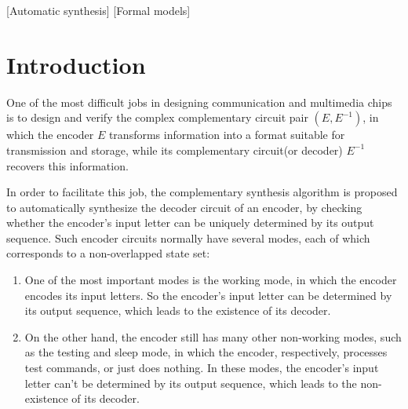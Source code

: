 \documentclass{sig-alternate}
\begin{document}
[Automatic synthesis]
[Formal models]


\newtheorem{algo}{Algorithm}
\newtheorem{lemma}{\textbf{Lemma}}
\newtheorem{theorem}{\textbf{Theorem}}

\section{Introduction}\label{sec_intro}

One of the most difficult jobs in designing communication and multimedia chips
is to design and verify the complex complementary circuit pair $(E,E^{-1})$,
in which the encoder $E$ transforms information into a format suitable for transmission and storage,
while its complementary circuit(or decoder) $E^{-1}$ recovers this information.

In order to facilitate this job,
the complementary synthesis algorithm\cite{ShengYuShen:iccad09,ShengYuShen:tcad} is proposed
to automatically synthesize the decoder circuit of an encoder,
by checking whether the encoder's input letter can be uniquely determined by its output sequence.
Such encoder circuits normally have several modes,
each of which corresponds to a non-overlapped state set:

\begin{enumerate}
\item One of the most important modes is the working mode,
in which the encoder encodes its input letters.
So the encoder's input letter can be determined by its output sequence,
which leads to the existence of its decoder.
\item On the other hand,
the encoder still has many other non-working modes,
such as the testing and sleep mode,
in which the encoder,
respectively,
processes test commands,
or just does nothing.
In these modes,
the encoder's input letter can't be determined by its output sequence,
which leads to the non-existence of its decoder.
\end{enumerate}
\end{document}
